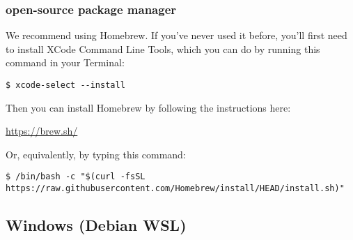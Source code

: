 \documentclass[11pt]{article}
\begin{document}
\subsubsection*{open-source package manager}
\label{sec:org0441f02}

We recommend using Homebrew.  If you've never used it before, you'll
first need to install XCode Command Line Tools, which you can do by
running this command in your Terminal:

\begin{verbatim}
$ xcode-select --install
\end{verbatim}

Then you can install Homebrew by following the instructions here:

\url{https://brew.sh/}

Or, equivalently, by typing this command:

\footnotesize

\begin{verbatim}
$ /bin/bash -c "$(curl -fsSL https://raw.githubusercontent.com/Homebrew/install/HEAD/install.sh)"
\end{verbatim}

\normalsize

\subsection*{Windows (Debian WSL) \label{org894ea3e}}
\label{sec:org59af166}
\end{document}

